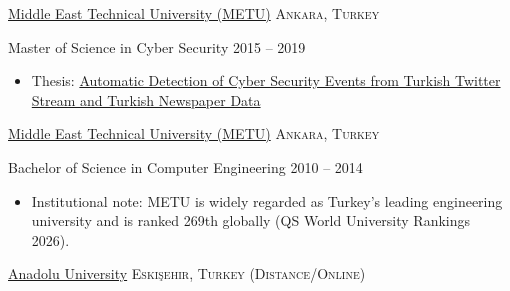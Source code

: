 \documentclass[10pt,a4paper]{article}
\begin{document}
\vspace{0.3cm}

\headedsection
{\href{http://www.metu.edu.tr/}{Middle East Technical University (METU)}}
{\textsc{Ankara, Turkey}} {
    \headedsubsection
    {Master of Science in Cyber Security}
    {2015 -- 2019}
    {
        \begin{itemize}
            \item Thesis: \href{https://github.com/ozzgural/MSThesis}{Automatic Detection of Cyber Security Events from Turkish Twitter Stream and Turkish Newspaper Data}
        \end{itemize}
    }
}

\vspace{0.3cm}

\headedsection
{\href{http://www.metu.edu.tr/}{Middle East Technical University (METU)}}
{\textsc{Ankara, Turkey}} {
    \headedsubsection
    {Bachelor of Science in Computer Engineering}
    {2010 -- 2014}
    {
        \begin{itemize}
            \item Institutional note: METU is widely regarded as Turkey's leading engineering university and is ranked 269th globally (QS World University Rankings 2026).
        \end{itemize}
    }
}

\vspace{0.3cm}

\headedsection
{\href{https://www.anadolu.edu.tr/en}{Anadolu University}}
{\textsc{Eskişehir, Turkey (Distance/Online)}}{
}

\spacedhrule{0.9em}{0.1em}
\end{document}
